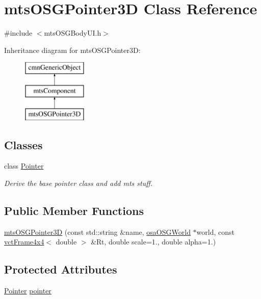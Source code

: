 \hypertarget{classmts_o_s_g_pointer3_d}{\section{mts\-O\-S\-G\-Pointer3\-D Class Reference}
\label{classmts_o_s_g_pointer3_d}
}


{\ttfamily \#include $<$mts\-O\-S\-G\-Body\-U\-I.\-h$>$}

Inheritance diagram for mts\-O\-S\-G\-Pointer3\-D\-:\begin{figure}[H]
\begin{center}
\leavevmode
\includegraphics[height=3.000000cm]{d4/d44/classmts_o_s_g_pointer3_d}
\end{center}
\end{figure}
\subsection*{Classes}
\begin{DoxyCompactItemize}
\item 
class \hyperlink{classmts_o_s_g_pointer3_d_1_1_pointer}{Pointer}
\begin{DoxyCompactList}\small\item\em Derive the base pointer class and add mts stuff. \end{DoxyCompactList}\end{DoxyCompactItemize}
\subsection*{Public Member Functions}
\begin{DoxyCompactItemize}
\item 
\hyperlink{classmts_o_s_g_pointer3_d_ade933869c35fab1caa4a5d39b17b78cd}{mts\-O\-S\-G\-Pointer3\-D} (const std\-::string \&name, \hyperlink{classosa_o_s_g_world}{osa\-O\-S\-G\-World} $\ast$world, const \hyperlink{classvct_frame4x4}{vct\-Frame4x4}$<$ double $>$ \&Rt, double scale=1., double alpha=1.)
\end{DoxyCompactItemize}
\subsection*{Protected Attributes}
\begin{DoxyCompactItemize}
\item 
\hyperlink{classmts_o_s_g_pointer3_d_1_1_pointer}{Pointer} \hyperlink{classmts_o_s_g_pointer3_d_a0c87dc19f3d51680651e6aaa86fee270}{pointer}
\end{DoxyCompactItemize}
